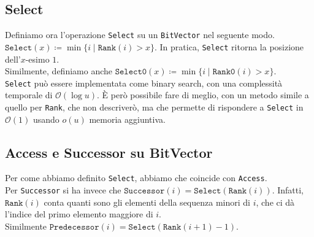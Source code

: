 \documentclass{article}
\newcommand{\ttt}{\texttt}
\newcommand*{\OO}{\ensuremath{\mathcal{O}}}
\begin{document}
\subsection{Select}
Definiamo ora l'operazione \ttt{Select} su un \ttt{BitVector} nel seguente modo.\\
$\ttt{Select}(x) \coloneq \min \{i \mid \ttt{Rank}(i) > x \}$. In pratica, \ttt{Select} ritorna la posizione dell'$x$-esimo $1$.\\
Similmente, definiamo anche $\ttt{Select0}(x) \coloneq \min \{i \mid \ttt{Rank0}(i) > x \}$.\\
\ttt{Select} pu\`o essere implementata come binary search, con una complessit\`a temporale di $\OO({\log u})$. \`E per\`o possibile fare di meglio, con un metodo simile a quello per \ttt{Rank}, che non descriver\`o, ma che permette di rispondere a \ttt{Select} in $\OO(1)$ usando $o(u)$ memoria aggiuntiva.

\subsection{Access e Successor su BitVector}
Per come abbiamo definito \ttt{Select}, abbiamo che coincide con \ttt{Access}.\\
Per \ttt{Successor} si ha invece che $\ttt{Successor}(i) = \ttt{Select}(\ttt{Rank}(i))$.
Infatti, $\ttt{Rank}(i)$ conta quanti sono gli elementi della sequenza minori di $i$, che ci d\`a l'indice del primo elemento maggiore di $i$.\\
Similmente $\ttt{Predecessor}(i) = \ttt{Select}(\ttt{Rank}(i + 1) - 1)$.
\end{document}

